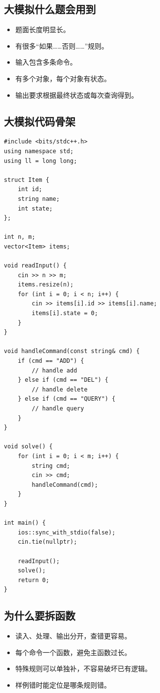 \subsection{大模拟什么题会用到}

\begin{itemize}
  \item 题面长度明显长。
  \item 有很多“如果……否则……”规则。
  \item 输入包含多条命令。
  \item 有多个对象，每个对象有状态。
  \item 输出要求根据最终状态或每次查询得到。
\end{itemize}

\subsection{大模拟代码骨架}

\begin{lstlisting}
#include <bits/stdc++.h>
using namespace std;
using ll = long long;

struct Item {
    int id;
    string name;
    int state;
};

int n, m;
vector<Item> items;

void readInput() {
    cin >> n >> m;
    items.resize(n);
    for (int i = 0; i < n; i++) {
        cin >> items[i].id >> items[i].name;
        items[i].state = 0;
    }
}

void handleCommand(const string& cmd) {
    if (cmd == "ADD") {
        // handle add
    } else if (cmd == "DEL") {
        // handle delete
    } else if (cmd == "QUERY") {
        // handle query
    }
}

void solve() {
    for (int i = 0; i < m; i++) {
        string cmd;
        cin >> cmd;
        handleCommand(cmd);
    }
}

int main() {
    ios::sync_with_stdio(false);
    cin.tie(nullptr);

    readInput();
    solve();
    return 0;
}
\end{lstlisting}

\subsection{为什么要拆函数}

\begin{itemize}
  \item 读入、处理、输出分开，查错更容易。
  \item 每个命令一个函数，避免主函数过长。
  \item 特殊规则可以单独补，不容易破坏已有逻辑。
  \item 样例错时能定位是哪条规则错。
\end{itemize}

